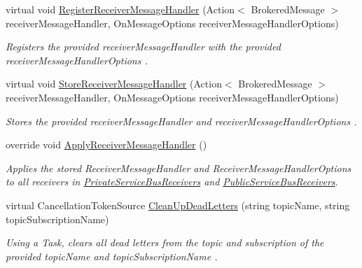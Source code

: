\begin{DoxyCompactItemize}
virtual void \hyperlink{classCqrs_1_1Azure_1_1ServiceBus_1_1AzureServiceBus_ad19764cc41efba37d6a8d96f8a58f906_ad19764cc41efba37d6a8d96f8a58f906}{Register\+Receiver\+Message\+Handler} (Action$<$ Brokered\+Message $>$ receiver\+Message\+Handler, On\+Message\+Options receiver\+Message\+Handler\+Options)
\begin{DoxyCompactList}\small\item\em Registers the provided {\itshape receiver\+Message\+Handler}  with the provided {\itshape receiver\+Message\+Handler\+Options} . \end{DoxyCompactList}\item 
virtual void \hyperlink{classCqrs_1_1Azure_1_1ServiceBus_1_1AzureServiceBus_adae5c09b9b3123bd998e99b5b76e21e2_adae5c09b9b3123bd998e99b5b76e21e2}{Store\+Receiver\+Message\+Handler} (Action$<$ Brokered\+Message $>$ receiver\+Message\+Handler, On\+Message\+Options receiver\+Message\+Handler\+Options)
\begin{DoxyCompactList}\small\item\em Stores the provided {\itshape receiver\+Message\+Handler}  and {\itshape receiver\+Message\+Handler\+Options} . \end{DoxyCompactList}\item 
override void \hyperlink{classCqrs_1_1Azure_1_1ServiceBus_1_1AzureServiceBus_a6ea94560e02fce0d920c467062f5fc98_a6ea94560e02fce0d920c467062f5fc98}{Apply\+Receiver\+Message\+Handler} ()
\begin{DoxyCompactList}\small\item\em Applies the stored Receiver\+Message\+Handler and Receiver\+Message\+Handler\+Options to all receivers in \hyperlink{classCqrs_1_1Azure_1_1ServiceBus_1_1AzureServiceBus_ac52e1a7e17f4ffb80f95d31424101aaa_ac52e1a7e17f4ffb80f95d31424101aaa}{Private\+Service\+Bus\+Receivers} and \hyperlink{classCqrs_1_1Azure_1_1ServiceBus_1_1AzureServiceBus_ac73f294e6a99655f2ff7e391646f2e5d_ac73f294e6a99655f2ff7e391646f2e5d}{Public\+Service\+Bus\+Receivers}. \end{DoxyCompactList}\item 
virtual Cancellation\+Token\+Source \hyperlink{classCqrs_1_1Azure_1_1ServiceBus_1_1AzureServiceBus_a8d1d5833d49b7793933825f2a13fb8b7_a8d1d5833d49b7793933825f2a13fb8b7}{Clean\+Up\+Dead\+Letters} (string topic\+Name, string topic\+Subscription\+Name)
\begin{DoxyCompactList}\small\item\em Using a Task, clears all dead letters from the topic and subscription of the provided {\itshape topic\+Name}  and {\itshape topic\+Subscription\+Name} . \end{DoxyCompactList}\end{DoxyCompactItemize}
